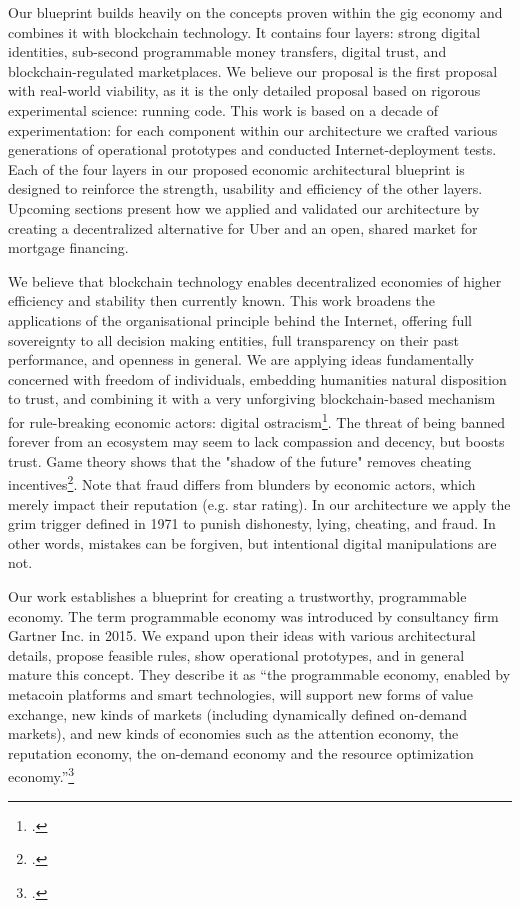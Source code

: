 \documentclass[USenglish]{article}
\begin{document}
Our blueprint builds heavily on the concepts proven within the gig economy and combines it with blockchain technology.
It contains four layers: strong digital identities, sub-second programmable money transfers, digital trust, and blockchain-regulated marketplaces.
We believe our proposal is the first proposal with real-world viability, as it is the only detailed proposal based on rigorous experimental science: running code.
This work is based on a decade of experimentation: for each component within our architecture we crafted various generations of operational prototypes and conducted Internet-deployment tests.
Each of the four layers in our proposed economic architectural blueprint is designed to reinforce the strength, usability and efficiency of the other layers. 
Upcoming sections present how we applied and validated our architecture by creating a decentralized alternative for Uber and an open, shared market for mortgage financing.

We believe that blockchain technology enables decentralized economies of higher efficiency and stability then currently known. 
This work broadens the applications of the organisational principle behind the Internet, offering full sovereignty to all decision making entities, full transparency on their past performance, and openness in general.
We are applying ideas fundamentally concerned with freedom of individuals, embedding humanities natural disposition to trust, and combining it with a very unforgiving blockchain-based mechanism for rule-breaking economic actors: digital ostracism\footcite{bicchieri2004trust}. 
The threat of being banned forever from an ecosystem may seem to lack compassion and decency, but boosts trust. 
Game theory shows that the "shadow of the future" removes cheating incentives\footcite{friedman1971non}.
Note that fraud differs from blunders by economic actors, which merely impact their reputation (e.g. star rating).
In our architecture we apply the grim trigger defined in 1971 to punish dishonesty, lying, cheating, and fraud.
In other words, mistakes can be forgiven, but intentional digital manipulations are not.

Our work establishes a blueprint for creating a trustworthy, programmable economy.
The term programmable economy was introduced by consultancy firm Gartner Inc. in 2015. 
We expand upon their ideas with various architectural details, propose feasible rules, show operational prototypes, and in general mature this concept.
They describe it as ``the programmable economy, enabled by metacoin platforms and smart technologies, will support new forms of value exchange, new kinds of markets (including dynamically defined on-demand markets), and new kinds of economies such as the attention economy, the reputation economy, the on-demand economy and the resource optimization economy.''\footcite{gartnerprogrammableeconomy}
\end{document}
